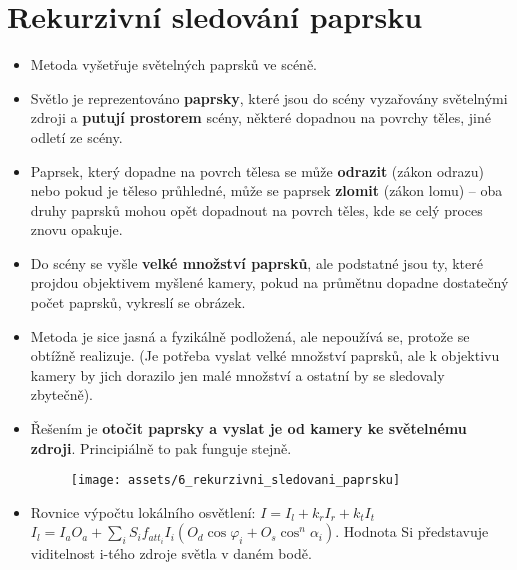 \section{Rekurzivní sledování paprsku}
\begin{itemize}
    \item Metoda vyšetřuje  světelných paprsků ve scéně.
    \item Světlo je reprezentováno \textbf{paprsky}, které jsou do scény vyzařovány světelnými zdroji a \textbf{putují prostorem} scény, některé dopadnou na povrchy těles, jiné odletí ze scény.
    \item Paprsek, který dopadne na povrch tělesa se může \textbf{odrazit} (zákon odrazu) nebo pokud je těleso průhledné, může se paprsek \textbf{zlomit} (zákon lomu) -- oba druhy paprsků mohou opět dopadnout na povrch těles, kde se celý proces znovu opakuje. %
    \item Do scény se vyšle \textbf{velké množství paprsků}, ale podstatné jsou ty, které projdou objektivem myšlené kamery, pokud na průmětnu dopadne dostatečný počet paprsků, vykreslí se obrázek.
    \item Metoda je sice jasná a fyzikálně podložená, ale nepoužívá se, protože se obtížně realizuje. (Je potřeba vyslat velké množství paprsků, ale k objektivu kamery by jich dorazilo jen malé množství a ostatní by se sledovaly zbytečně).
    \item Řešením je \textbf{otočit paprsky a vyslat je od kamery ke světelnému zdroji}. Principiálně to pak funguje stejně.
          \begin{figure}[H]
              \centering
              \texttt{[image: assets/6\_rekurzivni\_sledovani\_paprsku]}
          \end{figure}
    \item Rovnice výpočtu lokálního osvětlení: $I = I_l + k_rI_r + k_tI_t$ \\
          $I_l = I_aO_a + \sum\limits_{i} S_if_{att_i}I_i(O_d \cos{\varphi_i} + O_s \cos^n{\alpha_i} )$.
          Hodnota Si představuje viditelnost i-tého zdroje světla v daném bodě.
\end{itemize}
